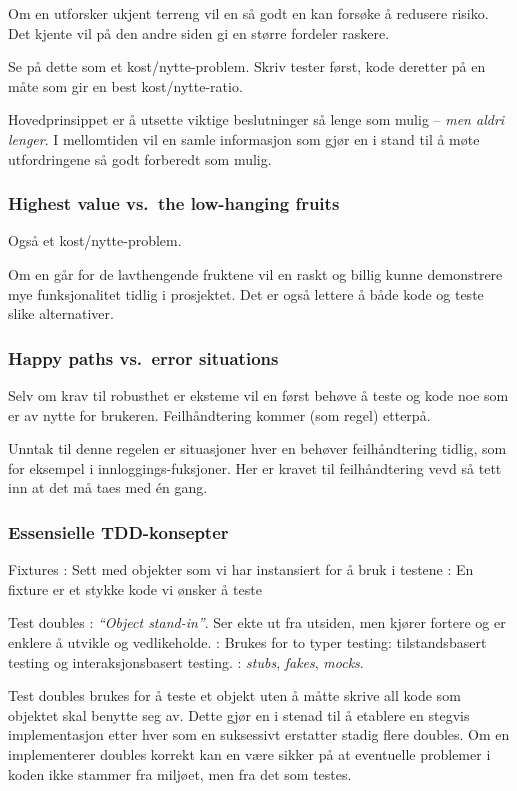 Om en utforsker ukjent terreng vil en så godt en kan forsøke å redusere
risiko. Det kjente vil på den andre siden gi en større fordeler raskere.

Se på dette som et kost/nytte-problem. Skriv tester først, kode deretter
på en måte som gir en best kost/nytte-ratio.

Hovedprinsippet er å utsette viktige beslutninger så lenge som mulig --
\emph{men aldri lenger}. I mellomtiden vil en samle informasjon som gjør
en i stand til å møte utfordringene så godt forberedt som mulig.

\subsubsection{Highest value vs.~the low-hanging fruits}

Også et kost/nytte-problem.

Om en går for de lavthengende fruktene vil en raskt og billig kunne
demonstrere mye funksjonalitet tidlig i prosjektet. Det er også lettere
å både kode og teste slike alternativer.

\subsubsection{Happy paths vs.~error situations}

Selv om krav til robusthet er eksteme vil en først behøve å teste og
kode noe som er av nytte for brukeren. Feilhåndtering kommer (som regel)
etterpå.

Unntak til denne regelen er situasjoner hver en behøver feilhåndtering
tidlig, som for eksempel i innloggings-fuksjoner. Her er kravet til
feilhåndtering vevd så tett inn at det må taes med én gang.

\subsubsection{Essensielle TDD-konsepter}

Fixtures : Sett med objekter som vi har instansiert for å bruk i testene
: En fixture er et stykke kode vi ønsker å teste

Test doubles : \emph{``Object stand-in''}. Ser ekte ut fra utsiden, men
kjører fortere og er enklere å utvikle og vedlikeholde. : Brukes for to
typer testing: tilstandsbasert testing og interaksjonsbasert testing. :
\emph{stubs}, \emph{fakes}, \emph{mocks}.

Test doubles brukes for å teste et objekt uten å måtte skrive all kode
som objektet skal benytte seg av. Dette gjør en i stenad til å etablere
en stegvis implementasjon etter hver som en suksessivt erstatter stadig
flere doubles. Om en implementerer doubles korrekt kan en være sikker på
at eventuelle problemer i koden ikke stammer fra miljøet, men fra det
som testes.

